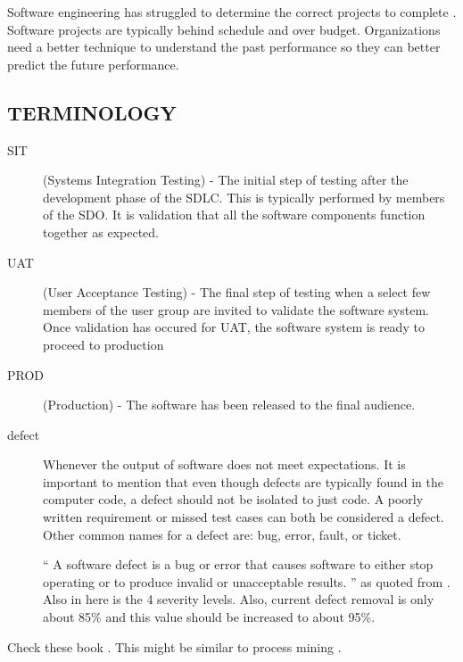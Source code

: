\documentclass[SDSUThesis.tex]{subfiles}
\begin{document}
    
    Software engineering has struggled to determine the correct projects to complete \cite{DeMarco2009}.
    Software projects are typically behind schedule and over budget. Organizations need a better
    technique to understand the past performance so they can better predict the future performance.

\subsection{TERMINOLOGY}

\begin{description}
    \item[SIT]   (Systems Integration Testing) - The initial step of testing
        after the development phase of the SDLC.  This is typically 
        performed by members of the SDO.  It is validation that all the
        software components function together as expected.
    \item[UAT]   (User Acceptance Testing) - The final step of testing
        when a select few members of the user group are invited to
        validate the software system. Once validation has occured for
        UAT, the software system is ready to proceed to production
    \item[PROD]  (Production) - The software has been released to the final audience.
    \item[defect] Whenever the output of software does not meet expectations.  It is important to mention that even though defects are typically 
            found in the computer code, a defect should not be isolated to just code.   A poorly written requirement or missed test cases can 
            both be considered a defect.  Other common names for a defect are: bug, error, fault, or ticket.
            
            ``
                A software defect is a bug or error that causes
                software to either stop operating or to produce
                invalid or unacceptable results.
            '' as quoted from
            \cite{Jones2009}.  Also in here is the 4 severity levels.  Also, current defect removal is only about 85\% and this value should be increased to about 95\%. 
\end{description}

Check these book \cite{Jones2009, Jones1996, Lee2003}. This might be similar
to process mining \cite{vanderAalst2012}.  
\end{document}
